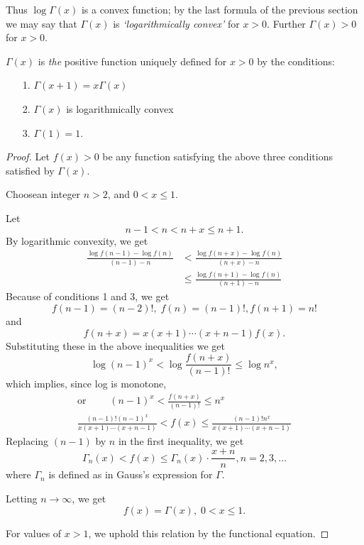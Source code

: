 Thus $\log \Gamma(x)$ is a convex function; by the last formula of the
previous section we may say that $\Gamma(x)$ is
\textit{`logarithmically convex'} for $x>0$. Further $\Gamma(x)>0$ for
$x>0$.

\begin{theorem*}
$\Gamma(x)$ is {\em the} positive function uniquely defined for $x>0$ by the
  conditions: 
\begin{itemize}
\item[1.] $\Gamma(x+1) = x\Gamma(x)$

\item[2.] $\Gamma(x)$ is logarithmically convex

\item[3.] $\Gamma (1) =1$.
\end{itemize}
\end{theorem*}

\begin{proof}
Let $f(x)>0$ be any function satisfying the above three conditions
satisfied by $\Gamma(x)$.

Choose\pageoriginale an integer $n>2$, and $0<x\leq 1$.

Let 
$$
n-1 < n < n + x \leq n +1.
$$
By logarithmic convexity, we get
\begin{align*}
\frac{\log f(n-1) - \log f(n)}{(n-1)-n} & < \frac{\log f(n+x) - \log
  f(n)}{(n+x)-n} \\
& \leq \frac{\log f(n+1) - \log f(n)}{(n+1)-n}
\end{align*}
Because of conditions 1 and 3, we get
$$
f(n-1) = (n-2)!, \; f(n) = (n-1)!, f(n+1) = n!
$$
and
$$
f(n+x) = x(x+1) \cdots (x+n-1) f(x).
$$
Substituting these in the above inequalities we get
$$
\log (n-1)^x < \log \frac{f(n+x)}{(n-1)!} \leq \log n^x,
$$
which implies, since log is monotone,
\begin{gather*}
\text{or } \qquad (n-1)^x < \frac{f(n+x)}{(n-1)!} \leq n^x\\
\frac{(n-1)! (n-1)^x}{x(x+1) \cdots (x+n-1)} < f(x) \leq
\frac{(n-1)!n^x}{x(x+1) \cdots (x+n-1)}
\end{gather*}
Replacing $(n-1)$ by $n$ in the first inequality, we get
$$
\Gamma_n(x) < f(x) \leq \Gamma_n(x) \cdot \frac{x+n}{n}, n = 2, 3, \ldots
$$ 
where $\Gamma_n$ is defined as in Gauss's expression for $\Gamma$.

Letting $n\to \infty$, we get
$$
f(x) = \Gamma(x), \; 0 < x \leq 1.
$$

For values of $x>1$, we uphold this relation by the functional equation.
\end{proof}

